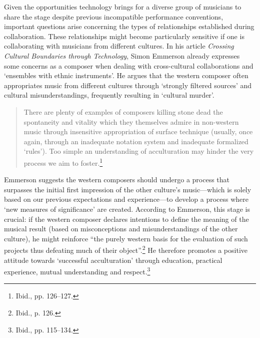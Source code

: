 Given the opportunities technology brings for a diverse group of musicians to share the stage despite previous incompatible performance conventions, important questions arise concerning the types of relationships established during collaboration. These relationships might become particularly sensitive if one is collaborating with musicians from different cultures. In his article \emph{Crossing Cultural Boundaries through Technology}, Simon Emmerson already expresses some concerns as a composer when dealing with cross-cultural collaborations and `ensembles with ethnic instruments'. He argues that the western composer often appropriates music from different cultures through `strongly filtered sources' and cultural misunderstandings, frequently resulting in `cultural murder'. 
\begin{quote}
There are plenty of examples of composers killing stone dead the spontaneity and vitality which they themselves admire in non-western music through insensitive appropriation of surface technique (usually, once again, through an inadequate notation system and inadequate formalized `rules'). Too simple an understanding of acculturation may hinder the very process we aim to foster.\footnote{Ibid., pp. 126--127.} 
\end{quote}

Emmerson suggests the western composers should undergo a process that surpasses the initial first impression of the other culture's music---which is solely based on our previous expectations and experience---to develop a process where `new measures of significance' are created. According to Emmerson, this stage is crucial: if the western composer declares intentions to define the meaning of the musical result (based on misconceptions and misunderstandings of the other culture), he might reinforce ``the purely western basis for the evaluation of such projects thus defeating much of their object''.\footnote{Ibid., p. 126.} He therefore promotes a positive attitude towards `successful acculturation' through education, practical experience, mutual understanding and respect.\footnote{Ibid., pp. 115--134.} 

